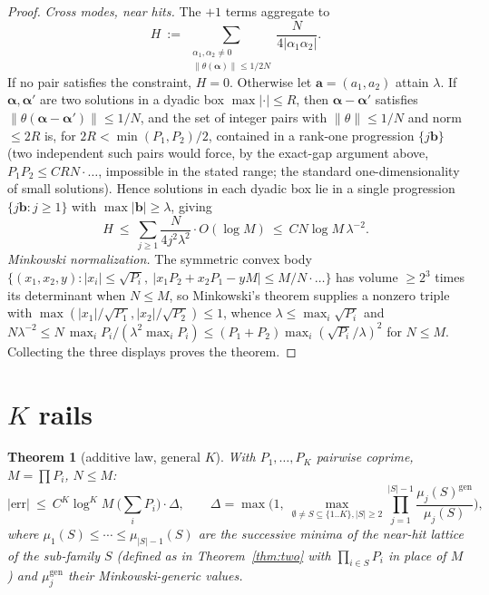 \documentclass[11pt]{article}
\newtheorem{theorem}{Theorem}
\newcommand{\nrm}[1]{\lVert #1\rVert}
\begin{document}
\begin{proof}
\emph{Cross modes, near hits.}  The $+1$ terms aggregate to
\[
H\ :=\ \sum_{\substack{\alpha_1,\alpha_2\ne0\\ \nrm{\theta(\boldsymbol\alpha)}\le1/2N}}
\frac{N}{4|\alpha_1\alpha_2|}.
\]
If no pair satisfies the constraint, $H=0$.  Otherwise let
$\mathbf a=(a_1,a_2)$ attain $\lambda$.  If $\boldsymbol\alpha,\boldsymbol\alpha'$
are two solutions in a dyadic box $\max|\cdot|\le R$, then
$\boldsymbol\alpha-\boldsymbol\alpha'$ satisfies
$\nrm{\theta(\boldsymbol\alpha-\boldsymbol\alpha')}\le1/N$, and the set of
integer pairs with $\nrm\theta\le1/N$ and norm $\le2R$ is, for
$2R<\min(P_1,P_2)/2$, contained in a rank-one progression $\{j\mathbf b\}$
(two independent such pairs would force, by the exact-gap argument above,
$P_1P_2\le CRN\cdot\ldots$, impossible in the stated range; the standard
one-dimensionality of small solutions).  Hence solutions in each dyadic box lie
in a single progression $\{j\mathbf b: j\ge1\}$ with $\max|\mathbf b|\ge\lambda$, giving
\[
H\ \le\ \sum_{j\ge1}\frac{N}{4 j^2\lambda^2}\cdot O(\log M)\ \le\ CN\log M\,\lambda^{-2}.
\]
\emph{Minkowski normalization.}  The symmetric convex body
$\{(x_1,x_2,y):|x_i|\le\sqrt{P_i},\ |x_1P_2+x_2P_1-yM|\le M/N\cdot\ldots\}$
has volume $\ge2^3$ times its determinant when $N\le M$, so Minkowski's theorem
supplies a nonzero triple with $\max(|x_1|/\sqrt{P_1},|x_2|/\sqrt{P_2})\le1$,
whence $\lambda\le\max_i\sqrt{P_i}$ and
$N\lambda^{-2}\le N\,\max_iP_i/(\lambda^2\max_iP_i)
\le(P_1+P_2)\max_i(\sqrt{P_i}/\lambda)^2$ for $N\le M$.
Collecting the three displays proves the theorem.
\end{proof}

\section{$K$ rails}

\begin{theorem}[additive law, general $K$]\label{thm:K}
With $P_1,\dots,P_K$ pairwise coprime, $M=\prod P_i$, $N\le M$:
\[
|\mathrm{err}|\ \le\ C^K\log^{K}M\ \Big(\sum_iP_i\Big)\cdot\Delta,
\qquad
\Delta=\max\Big(1,\ \max_{\emptyset\ne S\subseteq\{1..K\},|S|\ge2}
\prod_{j=1}^{|S|-1}\frac{\mu_j(S)^{\mathrm{gen}}}{\mu_j(S)}\Big),
\]
where $\mu_1(S)\le\cdots\le\mu_{|S|-1}(S)$ are the successive minima of the
near-hit lattice of the sub-family $S$ (defined as in Theorem~\ref{thm:two}
with $\prod_{i\in S}P_i$ in place of $M$) and $\mu_j^{\mathrm{gen}}$ their
Minkowski-generic values.
\end{theorem}
\end{document}
